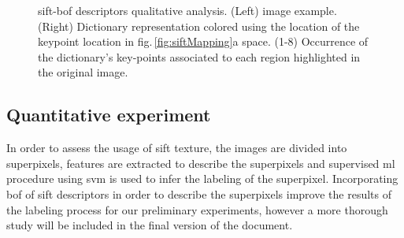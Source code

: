 \documentclass[a4paper, 10pt, conference]{llncs}      %
\begin{document}
\begin{figure}[Htbp]
 
\caption{\acs{sift}-\acs{bof} descriptors qualitative analysis. (Left) image example. (Right) Dictionary representation colored using the location of the keypoint location in fig.\,\ref{fig:siftMapping}a space. (1-8) Occurrence of the dictionary's key-points associated to each region highlighted in the original image.}
\label{fig:bow}
\end{figure}


\subsection{Quantitative experiment}
In order to assess the usage of \ac{sift} texture, the images are divided into superpixels, features are extracted to describe the superpixels and supervised \ac{ml} procedure using \ac{svm} is used to infer the labeling of the superpixel. Incorporating \ac{bof} of \ac{sift} descriptors in order to describe the superpixels improve the results of the labeling process for our preliminary experiments, however a more thorough study will be included in the final version of the document.
\end{document}
